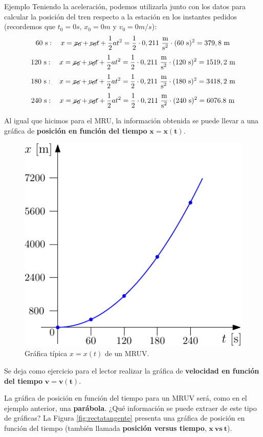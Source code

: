 \begin{example}{Ejemplo}
  Teniendo la aceleración, podemos utilizarla junto con los datos para calcular la posición del tren respecto a la estación en los instantes pedidos (recordemos que $t_0=0\si{s}$, $x_0=0\si{m}$ y $v_0=0\si{m/s}$):
  $$60\ \mbox{s}:\quad x = \cancel{x_0} + \cancel{v_0t} + \frac{1}{2}at^2= \frac{1}{2} \cdot 0,211\ \frac{\mbox{m}}{\mbox{s$^2$}} \cdot (60\ \mbox{s})^2  = 379,8 \ \mbox{m}$$
  $$120\ \mbox{s}:\quad x = \cancel{x_0} + \cancel{v_0t}+ \frac{1}{2}at^2 = \frac{1}{2} \cdot 0,211\ \frac{\mbox{m}}{\mbox{s$^2$}} \cdot (120\ \mbox{s})^2 = 1519,2\ \mbox{m}$$
  $$180\ \mbox{s}:\quad x = \cancel{x_0} + \cancel{v_0t}+ \frac{1}{2}at^2 = \frac{1}{2} \cdot 0,211\ \frac{\mbox{m}}{\mbox{s$^2$}} \cdot (180\ \mbox{s})^2 = 3418,2\ \mbox{m}$$
  $$240\ \mbox{s}:\quad x = \cancel{x_0} + \cancel{v_0t}+ \frac{1}{2}at^2 = \frac{1}{2} \cdot 0,211\ \frac{\mbox{m}}{\mbox{s$^2$}} \cdot (240\ \mbox{s})^2 = 6076.8\ \mbox{m}$$
\end{example}

Al igual que hicimos para el MRU, la información obtenida se puede llevar a una gráfica de \textbf{posición en función del tiempo} $\mathbold{x=x(t)}$.

\begin{figure}[!h]
  \centering
  \includegraphics[scale=1]{img/x_tgv.pdf}
  \caption{\label{fig:MRUV} Gráfica típica $x=x(t)$ de un MRUV.}
\end{figure}

Se deja como ejercicio para el lector realizar la gráfica de \textbf{velocidad en función del tiempo} $\mathbold{v=v(t)}$.

La gráfica de posición en función del tiempo para un MRUV será, como en el ejemplo anterior, una \textbf{parábola}. ¿Qué información se puede extraer de este tipo de gráficas? La Figura \ref{fig:rectatangente} presenta una gráfica de posición en función del tiempo (también llamada \textbf{posición versus tiempo}, $\mathbold{x\ \mathbf{vs}\ t}$).

